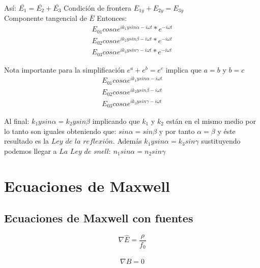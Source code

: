 \documentclass[]{article}
\begin{document}
Así: $\bar{E_1}=\bar{E_2}+\bar{E_3}$ Condición de frontera $E_{1y}+E_{2y}=E_{3y}$\\

Componente tangencial de $\bar{E}$ Entonces:\\

\begin{eqnarray}
E_{01}cos \alpha e^{ik_1y sin \alpha-i \omega t}*e^{-i \omega t}\\
E_{02}cos \alpha e^{ik_2y sin \beta-i \omega t}*e^{-i \omega t}\\
E_{03}cos \alpha e^{ik_3y sin \gamma-i \omega t}*e^{-i \omega t}
\end{eqnarray}


Nota importante para la simplificación $e^a+e^b=e^c$ implica que $a=b$ y $b=c$\\

\begin{eqnarray}
E_{01}cos \alpha e^{ik_1y sin \alpha-i \omega t}\\
E_{02}cos \alpha e^{ik_2y sin \beta-i \omega t}\\
E_{03}cos \alpha e^{ik_3y sin \gamma-i \omega t}
\end{eqnarray}

Al final: $k_1ysin \alpha=k_2y sin \beta$ implicando que $k_1$ y $k_2$ están en el mismo medio por lo tanto son iguales obteniendo que: $sin \alpha=sin \beta$ y por tanto $\alpha=\beta$ y éste resultado es la $Ley$ $de$ $la$ $reflexión$. Además $k_1ysin\alpha=k_3sin \gamma$ sustituyendo podemos llegar a $La$ $Ley$ $de$ $snell$: $n_1 sin \alpha=n_2 sin \gamma$\\

\section{Ecuaciones de Maxwell}



\subsection{Ecuaciones de Maxwell con fuentes}

\begin{equation}
\nabla \hat{E}=\frac{\rho}{f_0}
\label{gauss1}
\end{equation}

\begin{equation}
\nabla \hat{B}=0
\label{gauss2}
\end{equation}
\end{document}
